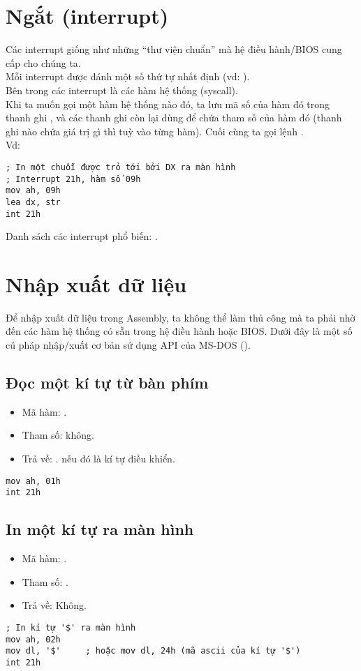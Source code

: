\documentclass[main.tex]{subfiles}
\begin{document}
\section{Ngắt (interrupt)}
Các interrupt giống như những ``thư viện chuẩn'' mà hệ điều hành/BIOS cung cấp cho chúng ta. \\
Mỗi interrupt được đánh một số thứ tự nhất định (vd: ).\\
Bên trong các interrupt là các hàm hệ thống (syscall).\\
Khi ta muốn gọi một hàm hệ thống nào đó, ta lưu mã số của hàm đó trong thanh ghi , và các thanh ghi còn lại dùng để chứa tham số của hàm đó (thanh ghi nào chứa giá trị gì thì tuỳ vào từng hàm). Cuối cùng ta gọi lệnh .\\
Vd:
\begin{verbatim}
; In một chuỗi được trỏ tới bởi DX ra màn hình 
; Interrupt 21h, hàm số 09h
mov ah, 09h 
lea dx, str 
int 21h
\end{verbatim} 
Danh sách các interrupt phổ biến: \href{https://jbwyatt.com/253/emu/8086_bios_and_dos_interrupts.html}{}.

\section{Nhập xuất dữ liệu}
Để nhập xuất dữ liệu trong Assembly, ta không thể làm thủ công mà ta phải nhờ đến các hàm hệ thống có sẵn trong hệ điều hành hoặc BIOS. Dưới đây là một số cú pháp nhập/xuất cơ bản sử dụng API của MS-DOS ().

\subsection{Đọc một kí tự từ bàn phím}
\begin{itemize}
    \item Mã hàm: .
    \item Tham số: không.
    \item Trả về: .  nếu đó là kí tự điều khiển.
\end{itemize}
\begin{verbatim}
mov ah, 01h 
int 21h
\end{verbatim}

\subsection{In một kí tự ra màn hình}
\begin{itemize}
    \item Mã hàm: .
    \item Tham số: .
    \item Trả về: Không.
\end{itemize}
\begin{verbatim}
; In kí tự '$' ra màn hình 
mov ah, 02h 
mov dl, '$'     ; hoặc mov dl, 24h (mã ascii của kí tự '$')
int 21h
\end{verbatim}
\end{document}

